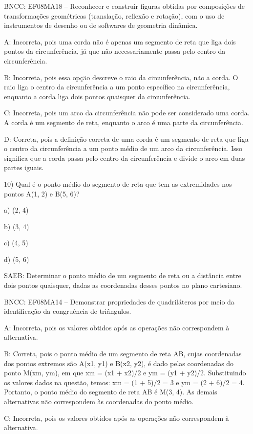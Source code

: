 BNCC: EF08MA18 -- Reconhecer e construir figuras obtidas por composições
de transformações geométricas (translação, reflexão e rotação), com o
uso de instrumentos de desenho ou de softwares de geometria dinâmica.

A: Incorreta, pois uma corda não é apenas um segmento de reta que liga
dois pontos da circunferência, já que não necessariamente passa pelo
centro da circunferência.

B: Incorreta, pois essa opção descreve o raio da circunferência, não a
corda. O raio liga o centro da circunferência a um ponto específico na
circunferência, enquanto a corda liga dois pontos quaisquer da
circunferência.

C: Incorreta, pois um arco da circunferência não pode ser considerado
uma corda. A corda é um segmento de reta, enquanto o arco é uma parte da
circunferência.

D: Correta, pois a definição correta de uma corda é um segmento de reta
que liga o centro da circunferência a um ponto médio de um arco da
circunferência. Isso significa que a corda passa pelo centro da
circunferência e divide o arco em duas partes iguais.

10) Qual é o ponto médio do segmento de reta que tem as extremidades nos
pontos A(1, 2) e B(5, 6)?

a) (2, 4)

b) (3, 4)

c) (4, 5)

d) (5, 6)

SAEB: Determinar o ponto médio de um segmento de reta ou a distância
entre dois pontos quaisquer, dadas as coordenadas desses pontos no plano
cartesiano.

BNCC: EF08MA14 -- Demonstrar propriedades de quadriláteros por meio da
identificação da congruência de triângulos.

A: Incorreta, pois os valores obtidos após as operações não correspondem
à alternativa.

B: Correta, pois o ponto médio de um segmento de reta AB, cujas
coordenadas dos pontos extremos são A(x1, y1) e B(x2, y2), é dado pelas
coordenadas do ponto M(xm, ym), em que xm = (x1 + x2)/2 e ym = (y1 +
y2)/2. Substituindo os valores dados na questão, temos: xm = (1 + 5)/2 =
3 e ym = (2 + 6)/2 = 4. Portanto, o ponto médio do segmento de reta AB é
M(3, 4). As demais alternativas não correspondem às coordenadas do ponto
médio.

C: Incorreta, pois os valores obtidos após as operações não correspondem
à alternativa.

